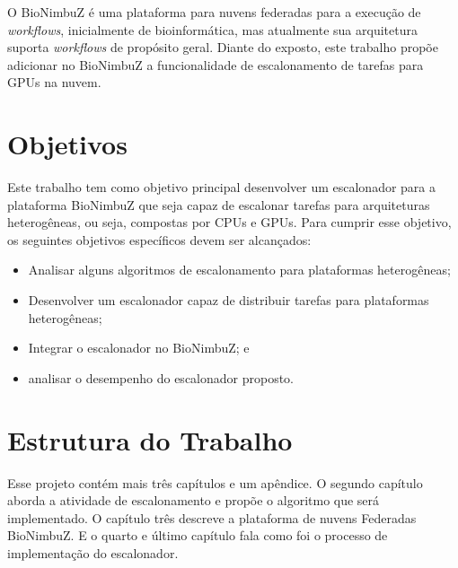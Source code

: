 O BioNimbuZ é uma plataforma para nuvens federadas para a execução de \textit{workflows}, inicialmente de bioinformática, mas atualmente sua arquitetura suporta \textit{workflows} de propósito geral. Diante do exposto, este trabalho propõe adicionar no BioNimbuZ a funcionalidade de escalonamento de tarefas para \acrshort{GPU}s na nuvem.


\section{Objetivos}
Este trabalho tem como objetivo principal desenvolver um escalonador para a plataforma BioNimbuZ que seja capaz de escalonar tarefas para arquiteturas heterogêneas, ou seja, compostas por \acrshort{CPU}s e \acrshort{GPU}s. Para cumprir esse objetivo, os seguintes objetivos específicos devem ser alcançados: 

\begin{itemize}
	\item Analisar alguns algoritmos de escalonamento para plataformas heterogêneas;
	\item Desenvolver um escalonador capaz de distribuir tarefas para plataformas heterogêneas;
	\item Integrar o escalonador no BioNimbuZ; e
	\item analisar o desempenho do escalonador proposto.
\end{itemize}

\section{Estrutura do Trabalho}
Esse projeto contém mais três capítulos e um apêndice. O segundo capítulo aborda a atividade de escalonamento e propõe o algoritmo que será implementado. O capítulo três descreve a plataforma de nuvens Federadas BioNimbuZ. E o quarto e último capítulo fala como foi o processo de implementação do escalonador.